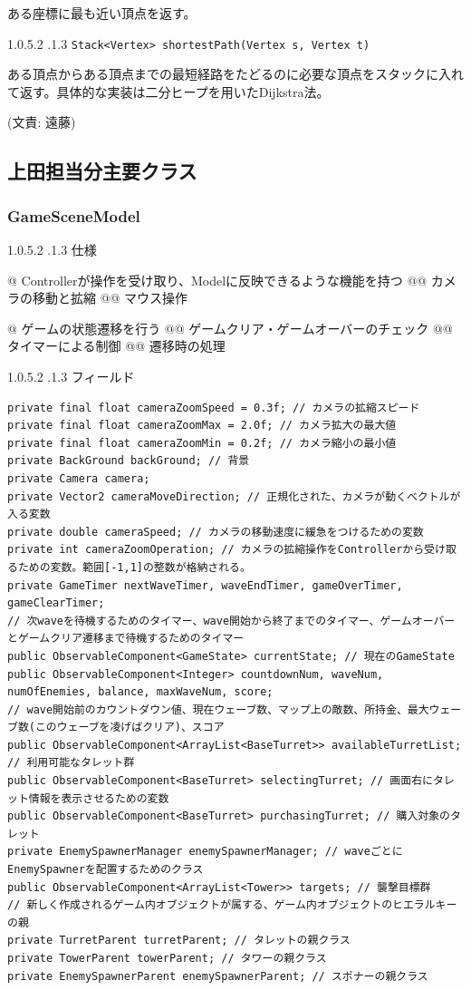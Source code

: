 \documentclass[11pt,a4j]{jarticle}
\makeatletter
\newcommand{\subsubsubsection}{\@startsection{paragraph}{4}{\z@}%
    {1.0\Cvs \@plus.5\Cdp \@minus.2\Cdp}%
    {.1\Cvs \@plus.3\Cdp}%
    {\reset@font\normalsize\bf}
}
\newcommand{\subsubsubsubsection}{\@startsection{subparagraph}{5}{\z@}%
    {1.0\Cvs \@plus.5\Cdp \@minus.2\Cdp}%
    {.1\Cvs \@plus.3\Cdp}%
    {\reset@font\normalsize\bf}
}
\makeatother
\begin{document}
ある座標に最も近い頂点を返す。

\subsubsubsubsection{\texttt{Stack<Vertex> shortestPath(Vertex s, Vertex t)}}

ある頂点からある頂点までの最短経路をたどるのに必要な頂点をスタックに入れて返す。具体的な実装は二分ヒープを用いたDijkstra法。

(文責: 遠藤)

\subsection{上田担当分主要クラス}

\subsubsection{GameSceneModel}

\subsubsubsection{仕様}

\begin{easylist}[itemize]
    @ Controllerが操作を受け取り、Modelに反映できるような機能を持つ
    @@ カメラの移動と拡縮
    @@ マウス操作

    @ ゲームの状態遷移を行う
    @@ ゲームクリア・ゲームオーバーのチェック
    @@ タイマーによる制御
    @@ 遷移時の処理
\end{easylist}

\subsubsubsection{フィールド}

\begin{lstlisting}[numbers=none]
private final float cameraZoomSpeed = 0.3f; // カメラの拡縮スピード
private final float cameraZoomMax = 2.0f; // カメラ拡大の最大値
private final float cameraZoomMin = 0.2f; // カメラ縮小の最小値
private BackGround backGround; // 背景
private Camera camera;
private Vector2 cameraMoveDirection; // 正規化された、カメラが動くベクトルが入る変数
private double cameraSpeed; // カメラの移動速度に緩急をつけるための変数
private int cameraZoomOperation; // カメラの拡縮操作をControllerから受け取るための変数。範囲[-1,1]の整数が格納される。
private GameTimer nextWaveTimer, waveEndTimer, gameOverTimer, gameClearTimer;
// 次waveを待機するためのタイマー、wave開始から終了までのタイマー、ゲームオーバーとゲームクリア遷移まで待機するためのタイマー
public ObservableComponent<GameState> currentState; // 現在のGameState
public ObservableComponent<Integer> countdownNum, waveNum, numOfEnemies, balance, maxWaveNum, score;
// wave開始前のカウントダウン値、現在ウェーブ数、マップ上の敵数、所持金、最大ウェーブ数(このウェーブを凌げばクリア)、スコア
public ObservableComponent<ArrayList<BaseTurret>> availableTurretList; // 利用可能なタレット群
public ObservableComponent<BaseTurret> selectingTurret; // 画面右にタレット情報を表示させるための変数
public ObservableComponent<BaseTurret> purchasingTurret; // 購入対象のタレット
private EnemySpawnerManager enemySpawnerManager; // waveごとにEnemySpawnerを配置するためのクラス
public ObservableComponent<ArrayList<Tower>> targets; // 襲撃目標群
// 新しく作成されるゲーム内オブジェクトが属する、ゲーム内オブジェクトのヒエラルキーの親
private TurretParent turretParent; // タレットの親クラス
private TowerParent towerParent; // タワーの親クラス
private EnemySpawnerParent enemySpawnerParent; // スポナーの親クラス
\end{lstlisting}
\end{document}
